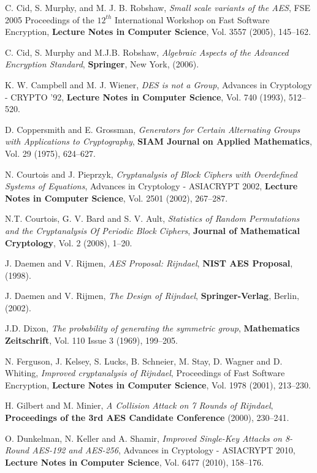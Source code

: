 \documentclass[11pt]{amsart}
\begin{document}
\begin{thebibliography}{9}
 C. Cid, S. Murphy, and M. J. B. Robshaw, \emph {Small scale variants of the AES},  FSE 2005 Proceedings of the $12^{th}$ International Workshop on Fast Software Encryption, {\bf Lecture Notes in Computer Science}, Vol. 3557 (2005), 145--162.

 C. Cid, S. Murphy and M.J.B. Robshaw, \emph {Algebraic Aspects of the Advanced Encryption Standard}, {\bf Springer}, New York, (2006).

 K. W. Campbell and M. J. Wiener, \emph {DES is not a Group},  {Advances in Cryptology - CRYPTO '92},  {\bf Lecture Notes in Computer Science}, Vol. 740 (1993),  512--520.

 D. Coppersmith and E. Grossman, \emph {Generators for {C}ertain {A}lternating {G}roups with {A}pplications to {C}ryptography}, {\bf SIAM Journal on Applied Mathematics}, Vol. 29 (1975), 624--627.

 N. Courtois and J. Pieprzyk, \emph {Cryptanalysis of Block Ciphers with Overdefined Systems of Equations},  Advances in Cryptology - ASIACRYPT 2002, {\bf Lecture Notes in Computer Science},  Vol. 2501 (2002),  267--287.

 N.T. Courtois, G. V. Bard and S. V. Ault, \emph {Statistics of Random Permutations and the Cryptanalysis Of Periodic Block Ciphers}, {\bf Journal of Mathematical Cryptology},  Vol.  2 (2008), 1--20.

  J. Daemen and V. Rijmen, \emph { AES Proposal: Rijndael},  {\bf NIST AES Proposal}, (1998).

 J. Daemen and V. Rijmen, \emph {The Design of Rijndael}, {\bf Springer-Verlag}, Berlin, (2002).


 J.D. Dixon,  \emph {The probability of generating the symmetric group}, {\bf Mathematics  Zeitschrift},  Vol. 110 Issue 3 (1969), 199--205.

 N. Ferguson, J. Kelsey, S. Lucks, B.  Schneier, M. Stay, D. Wagner and D. Whiting, \emph {Improved cryptanalysis of Rijndael}, Proceedings of Fast Software Encryption, {\bf Lecture Notes in Computer Science},  Vol. 1978 (2001), 213--230. 

 H. Gilbert and M. Minier, \emph {A Collision Attack on 7 Rounds of Rijndael}, {\bf  Proceedings of the 3rd AES Candidate Conference} (2000),  230--241.

 O. Dunkelman, N. Keller and A. Shamir, \emph {Improved Single-Key Attacks on 8-Round AES-192 and AES-256},  Advances in Cryptology - ASIACRYPT 2010,  {\bf Lecture Notes in Computer Science}, Vol. 6477 (2010), 158--176.


\end{thebibliography}
\end{document}

